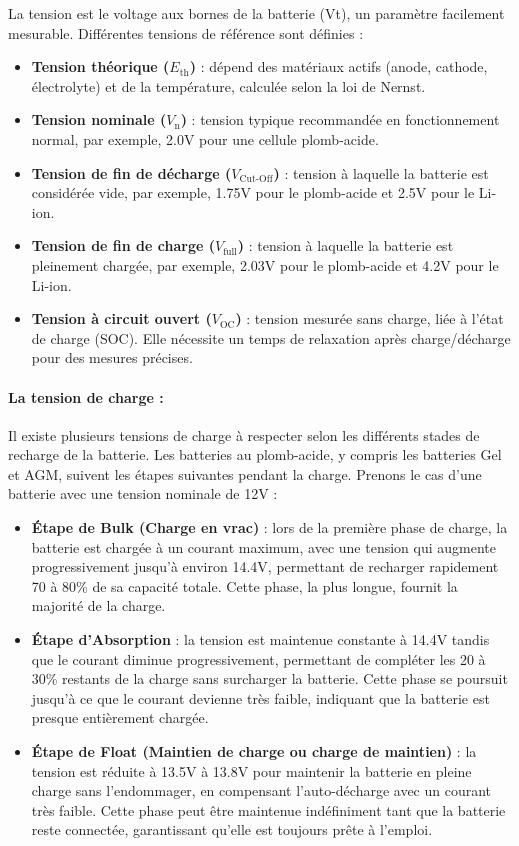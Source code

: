 La tension est le voltage aux bornes de la batterie (Vt), un paramètre facilement mesurable. Différentes tensions de référence sont définies :

\begin{itemize}
	\item \textbf{Tension théorique (\(E_{\text{th}}\))} : dépend des matériaux actifs (anode, cathode, électrolyte) et de la température, calculée selon la loi de Nernst.
	\item \textbf{Tension nominale (\(V_{\text{n}}\))} : tension typique recommandée en fonctionnement normal, par exemple, 2.0V pour une cellule plomb-acide.
	\item \textbf{Tension de fin de décharge (\(V_{\text{Cut-Off}}\))} : tension à laquelle la batterie est considérée vide, par exemple, 1.75V pour le plomb-acide et 2.5V pour le Li-ion.
	\item \textbf{Tension de fin de charge (\(V_{\text{full}}\))} : tension à laquelle la batterie est pleinement chargée, par exemple, 2.03V pour le plomb-acide et 4.2V pour le Li-ion.
	\item \textbf{Tension à circuit ouvert (\(V_{\text{OC}}\))} : tension mesurée sans charge, liée à l'état de charge (SOC). Elle nécessite un temps de relaxation après charge/décharge pour des mesures précises.
\end{itemize}
\paragraph{La tension de charge :}
Il existe plusieurs tensions de charge à respecter selon les différents stades de recharge de la batterie. Les batteries au plomb-acide, y compris les batteries Gel et AGM, suivent les étapes suivantes pendant la charge. Prenons le cas d'une batterie avec une tension nominale de 12V :

\begin{itemize}
	\item \textbf{Étape de Bulk (Charge en vrac)} :
	lors de la première phase de charge, la batterie est chargée à un courant maximum, avec une tension qui augmente progressivement jusqu'à environ 14.4V, permettant de recharger rapidement 70 à 80\% de sa capacité totale. Cette phase, la plus longue, fournit la majorité de la charge.
	
	\item \textbf{Étape d'Absorption} :
	la tension est maintenue constante à 14.4V tandis que le courant diminue progressivement, permettant de compléter les 20 à 30\% restants de la charge sans surcharger la batterie. Cette phase se poursuit jusqu'à ce que le courant devienne très faible, indiquant que la batterie est presque entièrement chargée.
	
	\item \textbf{Étape de Float (Maintien de charge ou charge de maintien)} :
	la tension est réduite à 13.5V à 13.8V pour maintenir la batterie en pleine charge sans l'endommager, en compensant l'auto-décharge avec un courant très faible. Cette phase peut être maintenue indéfiniment tant que la batterie reste connectée, garantissant qu'elle est toujours prête à l'emploi.
\end{itemize}

